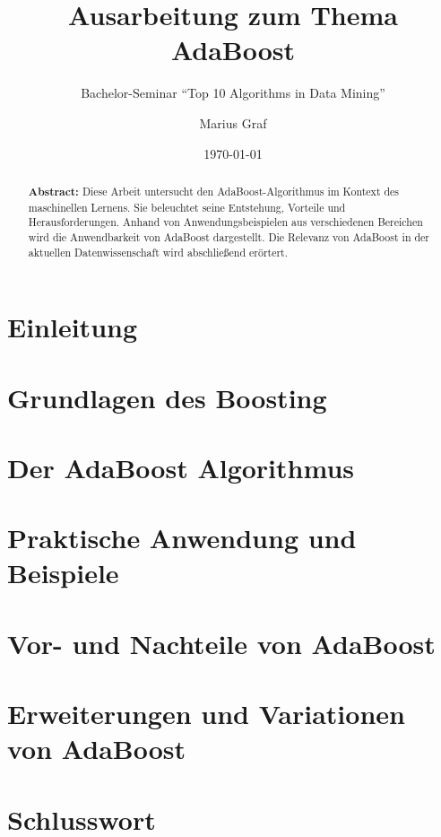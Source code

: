 \documentclass[11pt,a4paper,oneside]{scrartcl}
\begin{document}
\title{Ausarbeitung zum Thema AdaBoost}
\subtitle{Bachelor-Seminar "`Top 10 Algorithms in Data Mining"'}

\author{Marius Graf}
\date{\today}

\maketitle

\tableofcontents

\begin{abstract}
    \noindent\textbf{Abstract:}
    Diese Arbeit untersucht den AdaBoost-Algorithmus im Kontext des maschinellen Lernens.
    Sie beleuchtet seine Entstehung, Vorteile und Herausforderungen. Anhand von Anwendungsbeispielen aus
    verschiedenen Bereichen wird die Anwendbarkeit von AdaBoost dargestellt. Die Relevanz von AdaBoost in der
    aktuellen Datenwissenschaft wird abschließend erörtert.
\end{abstract}
\newpage

\section{Einleitung}


\section{Grundlagen des Boosting}


\section{Der AdaBoost Algorithmus}


\section{Praktische Anwendung und Beispiele}


\section{Vor- und Nachteile von AdaBoost}


\section{Erweiterungen und Variationen von AdaBoost}



\section{Schlusswort}




\end{document}
